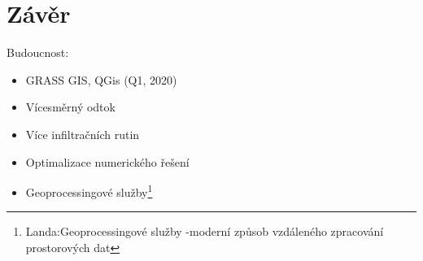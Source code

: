 \section{Závěr}
\begin{frame}
    Budoucnost:\vspace{1em}
    \begin{itemize}
        \item GRASS GIS, QGis (Q1, 2020)
        \item Vícesměrný odtok 
        \item Více infiltračních rutin
        \item Optimalizace numerického řešení
        \item Geoprocessingové služby\footnote{Landa:Geoprocessingové služby -moderní způsob vzdáleného zpracování prostorových dat}
    \end{itemize}
\end{frame}


